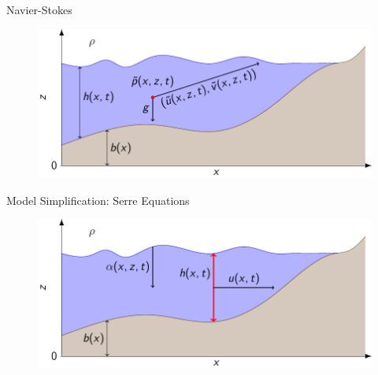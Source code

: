 \documentclass[pdf]{beamer}
\begin{document}
\begin{frame}{Navier-Stokes }
	\begin{figure}
		\includegraphics[width=\textwidth]{./Pics/Tex/WaterModel/NavierStokes.pdf}
	\end{figure}
\end{frame}

\begin{frame}{Model Simplification: Serre Equations }
	\begin{figure}
		\includegraphics[width=\textwidth]{./Pics/Tex/WaterModel/Serre.pdf}
	\end{figure}
\end{frame}
\end{document}
